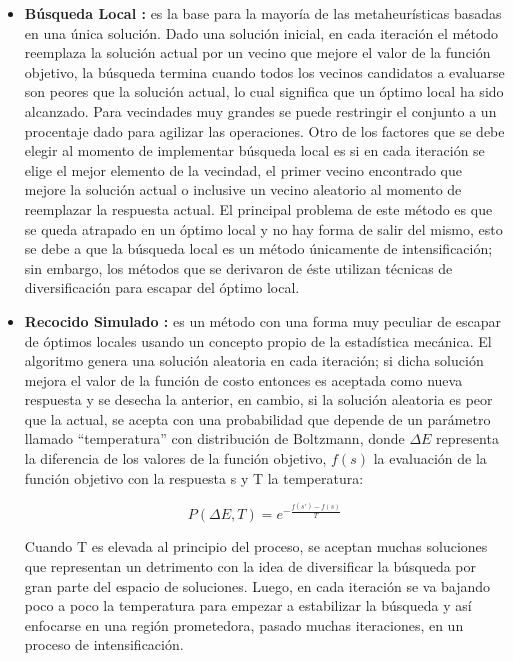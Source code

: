 \begin{itemize}

\item \textbf{Búsqueda Local \cite{talbi2009metaheuristics,aarts2003local}:}
es la base para la mayoría de las metaheurísticas basadas en una única solución. Dado una solución inicial, en cada iteración el método reemplaza la solución actual por un vecino que mejore el valor de la función objetivo, la búsqueda termina cuando todos los vecinos candidatos a evaluarse son peores que la solución actual, lo cual significa que un óptimo local ha sido alcanzado. Para vecindades muy grandes se puede restringir el conjunto a un procentaje dado para agilizar las operaciones. Otro de los factores que se debe elegir al momento de implementar búsqueda local es si en cada iteración se elige el mejor elemento de la vecindad, el primer vecino encontrado que mejore la solución actual o inclusive un vecino aleatorio al momento de reemplazar la respuesta actual. El principal problema de este método es que se queda atrapado en un óptimo local y no hay forma de salir del mismo, esto se debe a que la búsqueda local es un método únicamente de intensificación; sin embargo, los métodos que se derivaron de éste utilizan técnicas de diversificación para escapar del óptimo local.

\item \textbf{Recocido Simulado \cite{talbi2009metaheuristics,kirkpatrick1983optimization}:}
es un método con una forma muy peculiar de escapar de óptimos locales usando un concepto propio de la estadística mecánica. El algoritmo genera una solución aleatoria en cada iteración; si dicha solución mejora el valor de la función de costo entonces es aceptada como nueva respuesta y se desecha la anterior, en cambio, si la solución aleatoria es peor que la actual, se acepta con una probabilidad que depende de un parámetro llamado ``temperatura'' con distribución de Boltzmann, donde $\Delta E$ representa la diferencia de los valores de la función objetivo, $f(s)$ la evaluación de la función objetivo con la respuesta s y T la temperatura:

\begin{equation}
P(\Delta E,T) = e^{-\frac{f(s')-f(s)}{T}}
\end{equation} 

Cuando T es elevada al principio del proceso, se aceptan muchas soluciones que representan un detrimento con la idea de diversificar la búsqueda por gran parte del espacio de soluciones. Luego, en cada iteración se va bajando poco a poco la temperatura para empezar a estabilizar la búsqueda y así enfocarse en una región prometedora, pasado muchas iteraciones, en un proceso de intensificación. 


\end{itemize}

